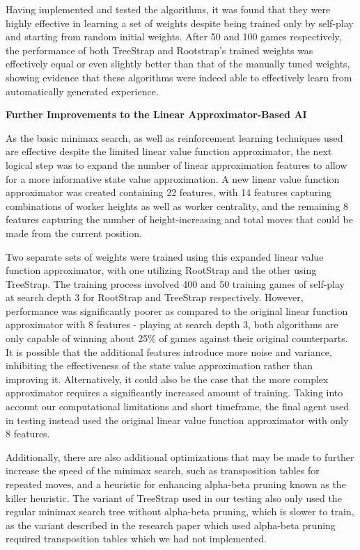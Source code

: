 \documentclass[a4paper,12pt,table]{article}
\begin{document}
Having implemented and tested the algorithms, it was found that they were highly effective in learning a set of weights despite being trained only by self-play and starting from random initial weights. After 50 and 100 games respectively, the performance of both TreeStrap and Rootstrap’s trained weights was effectively equal or even slightly better than that of the manually tuned weights, showing evidence that these algorithms were indeed able to effectively learn from automatically generated experience. \par

\textbf{Further Improvements to the Linear Approximator-Based AI}

As the basic minimax search, as well as reinforcement learning techniques used are effective despite the limited linear value function approximator, the next logical step was to expand the number of linear approximation features to allow for a more informative state value approximation. A new linear value function approximator was created containing 22 features, with 14 features capturing combinations of worker heights as well as worker centrality, and the remaining 8 features capturing the number of height-increasing and total moves that could be made from the current position. \par

Two separate sets of weights were trained using this expanded linear value function approximator, with one utilizing RootStrap and the other using TreeStrap. The training process involved 400 and 50 training games of self-play at search depth 3 for RootStrap and TreeStrap respectively. However, performance was significantly poorer as compared to the original linear function approximator with 8 features - playing at search depth 3, both algorithms are only capable of winning about 25\% of games against their original counterparts. It is possible that the additional features introduce more noise and variance, inhibiting the effectiveness of the state value approximation rather than improving it. Alternatively, it could also be the case that the more complex approximator requires a significantly increased amount of training. Taking into account our computational limitations and short timeframe, the final agent used in testing instead used the original linear value function approximator with only 8 features. \par

Additionally, there are also additional optimizations that may be made to further increase the speed of the minimax search, such as transposition tables for repeated moves, and a heuristic for enhancing alpha-beta pruning known as the killer heuristic. \cite{Artificial Intelligence: A Modern Approach} The variant of TreeStrap used in our testing also only used the regular minimax search tree without alpha-beta pruning, which is slower to train, as the variant described in the research paper \cite{Bootstrapping from Game Tree Search} which used alpha-beta pruning required transposition tables which we had not implemented. \par
\end{document}
